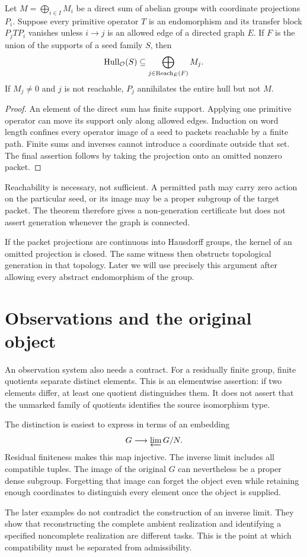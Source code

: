 \begin{theorem}
\label{thm:reach}
Let $M=\bigoplus_{i\in I}M_i$ be a direct sum of abelian groups with coordinate projections $P_i$. Suppose every primitive operator $T$ is an endomorphism and its transfer block $P_jTP_i$ vanishes unless $i\to j$ is an allowed edge of a directed graph $E$. If $F$ is the union of the supports of a seed family $S$, then
\[
\operatorname{Hull}_{\mathcal O}(S)\subseteq
\bigoplus_{j\in\operatorname{Reach}_E(F)}M_j.
\]
If $M_j\ne0$ and $j$ is not reachable, $P_j$ annihilates the entire hull but not $M$.
\end{theorem}
\begin{proof}
An element of the direct sum has finite support. Applying one primitive operator can move its support only along allowed edges. Induction on word length confines every operator image of a seed to packets reachable by a finite path. Finite sums and inverses cannot introduce a coordinate outside that set. The final assertion follows by taking the projection onto an omitted nonzero packet.
\end{proof}
Reachability is necessary, not sufficient. A permitted path may carry zero action on the particular seed, or its image may be a proper subgroup of the target packet. The theorem therefore gives a non-generation certificate but does not assert generation whenever the graph is connected.

If the packet projections are continuous into Hausdorff groups, the kernel of an omitted projection is closed. The same witness then obstructs topological generation in that topology. Later we will use precisely this argument after allowing every abstract endomorphism of the group.

\section{Observations and the original object}
An observation system also needs a contract. For a residually finite group, finite quotients separate distinct elements. This is an elementwise assertion: if two elements differ, at least one quotient distinguishes them. It does not assert that the unmarked family of quotients identifies the source isomorphism type.

The distinction is easiest to express in terms of an embedding
\[
G\longrightarrow \varprojlim G/N.
\]
Residual finiteness makes this map injective. The inverse limit includes all compatible tuples. The image of the original $G$ can nevertheless be a proper dense subgroup. Forgetting that image can forget the object even while retaining enough coordinates to distinguish every element once the object is supplied.

The later examples do not contradict the construction of an inverse limit. They show that reconstructing the complete ambient realization and identifying a specified noncomplete realization are different tasks. This is the point at which compatibility must be separated from admissibility.
